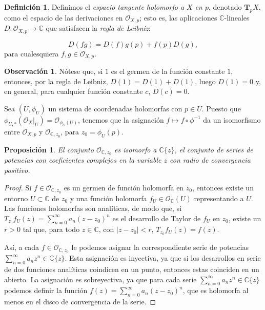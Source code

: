 \documentclass[12pt,a4paper]{article}
\newtheorem{prop}[thm]{Proposición}
\theoremstyle{definition} \newtheorem{defn}[thm]{Definición}
\theoremstyle{definition} \newtheorem{ejemplo}[thm]{Ejemplo}
\theoremstyle{definition} \newtheorem{ejercicio}[thm]{Ejercicio}
\newtheorem{obs}[thm]{Observación}
\def\CC{\mathbb{C}}
\def\OO{\mathscr{O}}
\begin{document}
\begin{defn}
  Definimos el \emph{espacio tangente holomorfo a $X$ en $p$}, denotado $\boldsymbol{T}_pX$, como el espacio de las derivaciones en $\OO_{X,p}$; esto es, las aplicaciones $\CC$-lineales $D:\OO_{X,p}\rightarrow \CC$ que satisfacen la \emph{regla de Leibniz}:

  \begin{equation*}
    D(fg)=D(f)g(p) + f(p) D(g),
  \end{equation*}
  para cualesquiera $f,g \in \OO_{X,p}$. 
\end{defn}

\begin{obs}
 Nótese que, si $1$ es el germen de la función constante $1$, entonces, por la regla de Leibniz, $D(1)= D(1) + D(1)$, luego $D(1)=0$ y, en general, para cualquier función constante $c$, $D(c)=0$.
\end{obs}

Sea $(U,\phi_U)$ un sistema de coordenadas holomorfas con $p\in U$. Puesto que $\phi_{U,*}(\OO_X|_U)= \OO_{\phi_U(U)}$, tenemos que la asignación $f\mapsto f\circ \phi^{-1}$ da un isomorfismo entre $\OO_{X,p}$ y $\OO_{\CC,z_0}$, para $z_0=\phi_U(p)$.

\begin{prop}
  El conjunto $\OO_{\CC,z_0}$ es isomorfo a $\CC\{z\}$, el conjunto de series de potencias con coeficientes complejos en la variable $z$ con radio de convergencia positivo.
\end{prop}

\begin{proof}
  Si $f\in \OO_{\CC,z_0}$ es un germen de función holomorfa en $z_0$, entonces existe un entorno $U\subset \CC$ de $z_0$ y una función holomorfa $f_U\in \OO_{\CC}(U)$ representando a $U$. Las funciones holomorfas son analíticas, de modo que, si $T_{z_0} f_U (z) = \sum_{n=0}^\infty a_n (z-z_0)^n$ es el desarrollo de Taylor de $f_U$ en $z_0$, existe un $r>0$ tal que, para todo $z \in \CC$, con $|z-z_0|<r$, $T_{z_0} f_U (z) = f(z)$.

  Así, a cada $f\in \OO_{\CC,z_0}$ le podemos asignar la correspondiente serie de potencias $\sum_{n=0}^\infty a_n z^n \in \CC\{z\}$. Esta asignación es inyectiva, ya que si los desarrollos en serie de dos funciones analíticas coindicen en un punto, entonces estas coinciden en un abierto. La asignación es sobreyectiva, ya que para cada serie $\sum_{n=0}^\infty a_n z^n \in \CC\{z\}$ podemos definir la función $f(z) = \sum_{n=0}^\infty a_n (z-z_0)^n$, que es holomorfa al menos en el disco de convergencia de la serie.
\end{proof}
\end{document}
